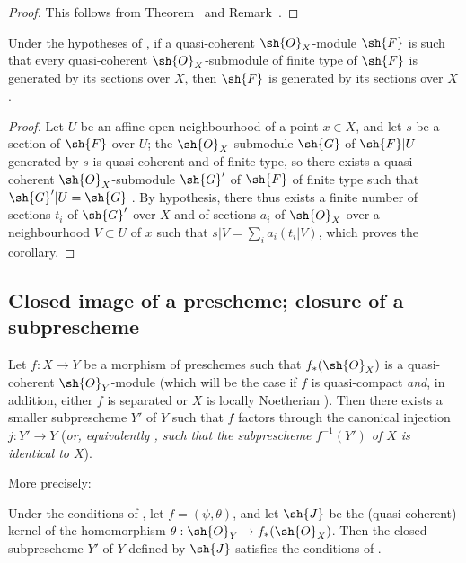 \begin{proof}
This follows from Theorem~ and Remark~.
\end{proof}

\begin{corollary}[9.4.10]
\label{I.9.4.10}
Under the hypotheses of , if a quasi-coherent $\sh{O}_X$-module $\sh{F}$ is
such that every quasi-coherent $\sh{O}_X$-submodule of finite type of $\sh{F}$ is generated by
its sections over $X$, then $\sh{F}$ is generated by its sections over $X$.
\end{corollary}

\begin{proof}
Let $U$ be an affine open neighbourhood of a point $x\in X$, and let $s$ be a
section of $\sh{F}$ over $U$; the $\sh{O}_X$-submodule $\sh{G}$ of $\sh{F}|U$ generated by $s$
is quasi-coherent and of finite type, so there exists a quasi-coherent $\sh{O}_X$-submodule
$\sh{G}'$ of $\sh{F}$ of finite type such that $\sh{G}'|U=\sh{G}$ . By
hypothesis, there thus exists a finite number of sections $t_i$ of $\sh{G}'$ over $X$ and of
sections $a_i$ of $\sh{O}_X$ over a neighbourhood $V\subset U$ of $x$ such that
$s|V=\sum_i a_i(t_i|V)$, which proves the corollary.
\end{proof}

\subsection{Closed image of a prescheme; closure of a subprescheme}
\label{subsection:I.9.5}

\begin{proposition}[9.5.1]
\label{I.9.5.1}
Let $f:X\to Y$ be a morphism of preschemes such that $f_*(\sh{O}_X)$ is a quasi-coherent
$\sh{O}_Y$-module (which will be the case if $f$ is quasi-compact \emph{and}, in addition, either $f$ is separated or $X$ is locally Noetherian ). Then there exists a smaller
subprescheme $Y'$ of $Y$ such that $f$ factors through the canonical injection $j:Y'\to Y$
(\emph{or, equivalently , such that the subprescheme $f^{-1}(Y')$ of $X$ is
\emph{identical} to $X$}).
\end{proposition}

More precisely:
\begin{corollary}[9.5.2]
\label{I.9.5.2}
Under the conditions of , let $f=(\psi,\theta)$, and let $\sh{J}$ be the
(quasi-coherent) kernel of the homomorphism $\theta:\sh{O}_Y\to f_*(\sh{O}_X)$. Then the closed
subprescheme $Y'$ of $Y$ defined by $\sh{J}$ satisfies the conditions of .
\end{corollary}

